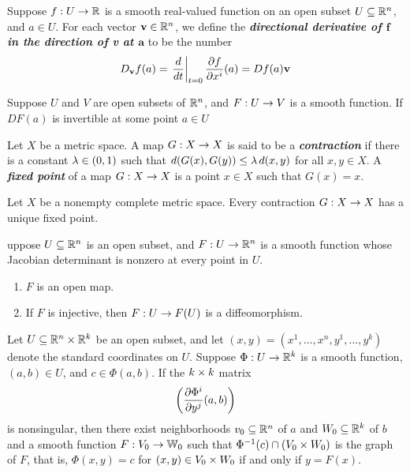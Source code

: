 \dfn Suppose $f:U\rightarrow \mathbb{R}$ is a smooth real-valued function on an open subset $U\subseteq \mathbb{R}^n$, and $a\in U$. For each vector $\textbf{v}\in \mathbb{R}^n$, we define the \textbf{\textit{directional derivative of $\boldsymbol{f}$ in the direction of v at $\boldsymbol{a}$}} to be the number
\[D_{\textbf{v}} f(a) = \left. \frac{d}{dt}\right|_{t = 0}\frac{\partial{f}}{\partial{x^i}}(a) = Df(a)\textbf{v}\]


\setcounter{thm}{33}
\begin{thm}\label{C_inv_fct}
Suppose $U$ and $V$ are open subsets of $\mathbb{R}^n$, and $F:U\rightarrow V$ is a smooth function. If $DF(a)$ is invertible at some point $a\in U$
\end{thm}

\dfn Let $X$ be a metric space. A map $G:X\rightarrow X$ is said to be a \textbf{\textit{contraction}} if there is a constant $\lambda\in (0,1)$ such that $d(G(x), G(y)) \leq \lambda\,d(x,y)$ for all $x,y\in X$. A \textbf{\textit{fixed point}} of a map $G:X\rightarrow X$ is a point $x\in X$ such that $G(x) = x$.

\begin{lem}
Let $X$ be a nonempty complete metric space. Every contraction $G:X\rightarrow X$ has a unique fixed point.
\end{lem}

\begin{cor}
uppose $U\subseteq\mathbb{R}^n$ is an open subset, and $F:U\rightarrow \mathbb{R}^n$ is a smooth function whose Jacobian determinant is nonzero at every point in $U$.
\begin{enumerate}
    \item $F$ is an open map.
    \item If $F$ is injective, then $F:U\rightarrow F(U)$ is a diffeomorphism.
\end{enumerate}
\end{cor}

\begin{thm}
Let  $U\subseteq \mathbb{R}^n\times\mathbb{R}^k$ be an open subset, and let $(x,y) = (x^1,\ldots,x^n,y^1,\ldots,y^k)$ denote the standard coordinates on $U$. Suppose $\Phi:U\rightarrow \mathbb{R}^k$ is a smooth function, $(a,b)\in U$, and $c\in \Phi(a,b)$. If the $k\times k$ matrix
\[\left(\frac{\partial{\Phi^i}}{\partial{y^j}}(a,b)\right)\]
is nonsingular, then there exist neighborhoods $v_0\subseteq \mathbb{R}^n$ of $a$ and $W_0\subseteq \mathbb{R}^k$ of $b$ and a smooth function $F:V_0\rightarrow \mathbb{W}_0$ such that $\Phi^{-1}(c)\cap (V_0\times W_0)$ is the graph of $F$, that is, $\Phi(x,y) = c$ for $(x,y)\in V_0\times W_0$ if and only if $y = F(x)$.
\end{thm}


